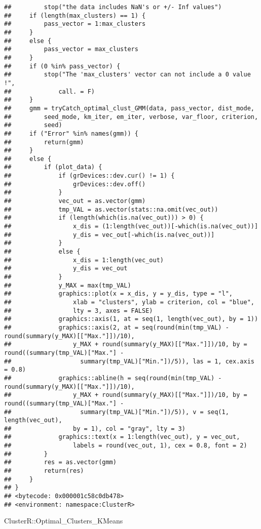 \documentclass[
]{article}
\newenvironment{Shaded}{\begin{snugshade}}{\end{snugshade}}
\newcommand{\NormalTok}[1]{#1}
\newcommand{\SpecialCharTok}[1]{\textcolor[rgb]{0.00,0.00,0.00}{#1}}
\begin{document}
\begin{verbatim}
##         stop("the data includes NaN's or +/- Inf values")
##     if (length(max_clusters) == 1) {
##         pass_vector = 1:max_clusters
##     }
##     else {
##         pass_vector = max_clusters
##     }
##     if (0 %in% pass_vector) {
##         stop("The 'max_clusters' vector can not include a 0 value !", 
##             call. = F)
##     }
##     gmm = tryCatch_optimal_clust_GMM(data, pass_vector, dist_mode, 
##         seed_mode, km_iter, em_iter, verbose, var_floor, criterion, 
##         seed)
##     if ("Error" %in% names(gmm)) {
##         return(gmm)
##     }
##     else {
##         if (plot_data) {
##             if (grDevices::dev.cur() != 1) {
##                 grDevices::dev.off()
##             }
##             vec_out = as.vector(gmm)
##             tmp_VAL = as.vector(stats::na.omit(vec_out))
##             if (length(which(is.na(vec_out))) > 0) {
##                 x_dis = (1:length(vec_out))[-which(is.na(vec_out))]
##                 y_dis = vec_out[-which(is.na(vec_out))]
##             }
##             else {
##                 x_dis = 1:length(vec_out)
##                 y_dis = vec_out
##             }
##             y_MAX = max(tmp_VAL)
##             graphics::plot(x = x_dis, y = y_dis, type = "l", 
##                 xlab = "clusters", ylab = criterion, col = "blue", 
##                 lty = 3, axes = FALSE)
##             graphics::axis(1, at = seq(1, length(vec_out), by = 1))
##             graphics::axis(2, at = seq(round(min(tmp_VAL) - round(summary(y_MAX)[["Max."]])/10), 
##                 y_MAX + round(summary(y_MAX)[["Max."]])/10, by = round((summary(tmp_VAL)["Max."] - 
##                   summary(tmp_VAL)["Min."])/5)), las = 1, cex.axis = 0.8)
##             graphics::abline(h = seq(round(min(tmp_VAL) - round(summary(y_MAX)[["Max."]])/10), 
##                 y_MAX + round(summary(y_MAX)[["Max."]])/10, by = round((summary(tmp_VAL)["Max."] - 
##                   summary(tmp_VAL)["Min."])/5)), v = seq(1, length(vec_out), 
##                 by = 1), col = "gray", lty = 3)
##             graphics::text(x = 1:length(vec_out), y = vec_out, 
##                 labels = round(vec_out, 1), cex = 0.8, font = 2)
##         }
##         res = as.vector(gmm)
##         return(res)
##     }
## }
## <bytecode: 0x000001c58c0db478>
## <environment: namespace:ClusterR>
\end{verbatim}

\begin{Shaded}
\begin{Highlighting}[]
\NormalTok{ClusterR}\SpecialCharTok{::}\NormalTok{Optimal\_Clusters\_KMeans}
\end{Highlighting}
\end{Shaded}
\end{document}
